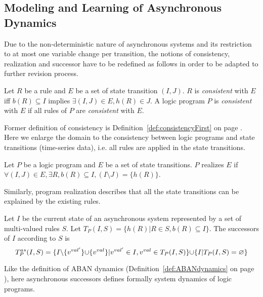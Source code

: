 \subsection{Modeling and Learning of Asynchronous Dynamics}\label{sec:alfit}

Due to the non-deterministic nature of asynchronous systems and its restriction to at most one variable change per transition,
the notions of consistency, realization and successor have to be redefined as follows in order to be adapted to further revision process.

\begin{definition}[Consistency]\label{def:consistencySecond}
	Let $R$ be a rule and $E$ be a set of state transition $(I,J)$.
	$R$ is {\it consistent} with $E$ iff
	$b(R)\subseteq I$ implies $\exists (I,J) \in E, h(R) \in J$.
	A logic program $P$ is {\it consistent} with $E$ if all rules of $P$ are {\it consistent} with $E$.
\end{definition}

Former definition of consistency is Definition~\ref{def:consistencyFirst} on page \pageref{def:consistencyFirst}.
Here we enlarge the domain to the consistency between logic programs and state transitions (time-series data), i.e. all rules are applied in the state transitions. 

\begin{definition}
	Let $P$ be a logic program and $E$ be a set of state transitions.
	$P$ realizes $E$ if $\forall (I,J) \in E, \exists R, b(R) \subseteq I, (I \setminus J) = \{h(R)\}$.
\end{definition}

Similarly, program realization describes that all the state transitions can be explained by the existing rules.

\begin{definition}
	Let $I$ be the current state of an asynchronous system represented by a set of multi-valued rules $S$.
	Let $T_P(I,S) = \{h(R) | R \in S, b(R) \subseteq I\}$.
	The successors of $I$ according to $S$ is
	$$T_P^{as}(I,S) = \{I \miset{v^{val'}} \addset{v^{val}} | v^{val'} \in I, v^{val} \in T_P(I,S)\} \addset{I|T_P(I,S) = \varnothing}$$ %
\end{definition}

Like the definition of ABAN dynamics (Definition~\ref{def:ABANdynamics} on page \pageref{def:ABANdynamics}), here asynchronous successors defines formally system dynamics of logic programs.

